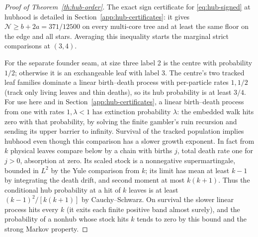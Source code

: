 \documentclass[11pt]{article}
\theoremstyle{remark}
\numberwithin{equation}{section}
\begin{document}
\begin{proof}[Proof of Theorem~\ref{th:hub-order}]
The exact sign certificate for \eqref{eq:hub-signed} at hubhood is detailed in Section~\ref{app:hub-certificates}: it gives $\mathcal N\ge b+2a=371/12500$ on every multi-core tree and at least the same floor on the edge and all stars. Averaging this inequality starts the marginal strict comparisons at $(3,4)$.

For the separate founder seam, at size three label 2 is the centre with probability $1/2$; otherwise it is an exchangeable leaf with label 3. The centre's two tracked leaf families dominate a linear birth--death process with per-particle rates $1,1/2$ (track only living leaves and thin deaths), so its hub probability is at least $3/4$. For use here and in Section~\ref{app:hub-certificates}, a linear birth--death process from one with rates $1,\lambda<1$ has extinction probability $\lambda$: the embedded walk hits zero with that probability, by solving the finite gambler's ruin recursion and sending its upper barrier to infinity. Survival of the tracked population implies hubhood even though this comparison has a slower growth exponent. In fact from $k$ physical leaves compare below by a chain with births $j$, total death rate one for $j>0$, absorption at zero. Its scaled stock is a nonnegative supermartingale, bounded in $L^2$ by the Yule comparison from $k$; its limit has mean at least $k-1$ by integrating the death drift, and second moment at most $k(k+1)$. Thus the conditional hub probability at a hit of $k$ leaves is at least $(k-1)^2/[k(k+1)]$ by Cauchy--Schwarz. On survival the slower linear process hits every $k$ (it exits each finite positive band almost surely), and the probability of a nonhub whose stock hits $k$ tends to zero by this bound and the strong Markov property.


\end{proof}
\end{document}
